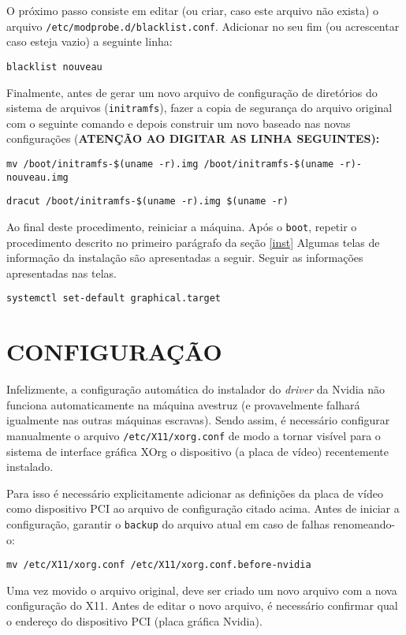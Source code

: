\documentclass[twoside,a4paper,12pt,english]{inac17}
\begin{document}
O próximo passo consiste em editar (ou criar, caso este arquivo não exista) 
o arquivo \texttt{/etc/modprobe.d/blacklist.conf}. Adicionar no seu fim (ou 
acrescentar caso esteja vazio) a seguinte linha:

\texttt{blacklist nouveau}

Finalmente, antes de gerar um novo arquivo de configuração de diretórios 
do sistema de arquivos (\texttt{initramfs}), fazer a copia de segurança 
do arquivo original com o seguinte comando e depois construir um novo baseado nas novas configurações (\textbf{ATENÇÃO AO DIGITAR AS LINHA SEGUINTES):}

\texttt{mv /boot/initramfs-\$(uname -r).img /boot/initramfs-\$(uname -r)-nouveau.img}

\texttt{dracut /boot/initramfs-\$(uname -r).img \$(uname -r)}

Ao final deste procedimento, reiniciar a máquina. Após o \texttt{boot}, 
repetir o procedimento descrito no primeiro parágrafo da seção \ref{inst} 
Algumas telas de informação da instalação são apresentadas a seguir. Seguir 
as informações apresentadas nas telas.


\texttt{systemctl set-default graphical.target}




\section{CONFIGURAÇÃO}

Infelizmente, a configuração automática do instalador do \textit{driver} da Nvidia 
não funciona automaticamente na máquina avestruz (e provavelmente falhará igualmente 
nas outras máquinas escravas). Sendo assim, é necessário configurar manualmente 
o arquivo \texttt{/etc/X11/xorg.conf} de modo a tornar visível para o sistema 
de interface gráfica XOrg o dispositivo (a placa de vídeo) recentemente instalado.

Para isso é necessário explicitamente adicionar as definições da placa de vídeo 
como dispositivo PCI ao arquivo de configuração citado acima. Antes de iniciar a 
configuração, garantir o \texttt{backup} do arquivo atual em caso de falhas renomeando-o:

\texttt{mv /etc/X11/xorg.conf /etc/X11/xorg.conf.before-nvidia}

Uma vez movido o arquivo original, deve ser criado um novo arquivo com a 
nova configuração do X11. Antes de editar o novo arquivo, é necessário 
confirmar qual o endereço do dispositivo PCI (placa gráfica Nvidia). 
\end{document}
